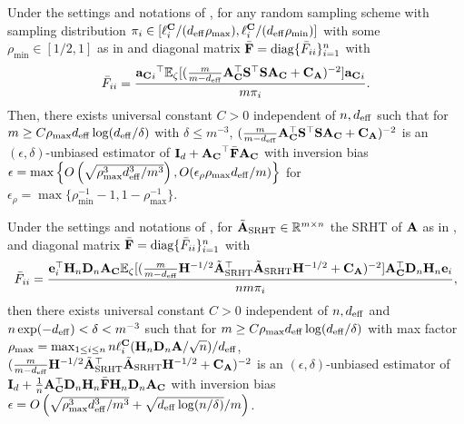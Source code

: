 \documentclass[11pt,a4paper]{article}
\begin{document}
\begin{corollary}\label{coro:sec.moment_lev}
Under the settings and notations of , for any random sampling scheme with sampling distribution $\pi_i\in [\ell^{\mathbf{C}}_{i}/(d_{\mathrm{eff}}\rho_{\max}), \ell^{\mathbf{C}}_{i}/(d_{\mathrm{eff}} \rho_{\min})]$ with some $\rho_{\min} \in [1/2,1]$ as in  and diagonal matrix $\bar {\mathbf{F}}=\operatorname{diag}\{\bar F_{ii}\}^n_{i=1}$ with
\begin{equation*}
    \bar F_{ii}= \frac{{{\mathbf{a}_{\mathbf{C}}}_i}^\top{\mathbb{E}}_{\zeta}[(\frac{m}{m-d_{\mathrm{eff}}}\mathbf{A}_{\mathbf{C}}^\top \mathbf{S}^\top \mathbf{S}\mathbf{A}_{\mathbf{C}}+ \mathbf{C}_{\mathbf{A}} )^{-2}]{\mathbf{a}_{\mathbf{C}}}_i}{m\pi_i}.
\end{equation*}  
Then, there exists universal constant $C > 0$ independent of $n,d_{\mathrm{eff}}$ such that for $m\geq C\rho_{\max} d_{\mathrm{eff}}\log(d_{\mathrm{eff}}/\delta )$ with $\delta\leq m^{-3}$, $(\frac{m}{m-d_{\mathrm{eff}}}\mathbf{A}_{\mathbf{C}}^\top \mathbf{S}^\top \mathbf{S}\mathbf{A}_{\mathbf{C}} + \mathbf{C}_{\mathbf{A}} )^{-2}$ is  an $(\epsilon,\delta)$-unbiased estimator of $\mathbf{I}_{d}+{\mathbf{A}_{\mathbf{C}}}^\top\bar {\mathbf{F}}{\mathbf{A}_{\mathbf{C}}}$ with inversion bias $\epsilon=\max\left\{O\left(\sqrt{\rho_{\max}^3d^3_{\mathrm{eff}}/m^3}\right),O(\epsilon_{\rho}\rho_{\max}d_{\mathrm{eff}}/m)\right\}$ for $\epsilon_{\rho}=\max\{\rho_{\min}^{-1}-1,1 - \rho_{\max}^{-1}\}$. 
\end{corollary}

\begin{corollary}\label{coro:sec.moment_SRHT}
Under the  settings and notations of , 
for $\tilde{\mathbf{A}}_{\rm SRHT} \in {\mathbb{R}}^{m \times n}$ the SRHT of $\mathbf{A}$ as in , and diagonal matrix $\bar {\mathbf{F}}=\operatorname{diag}\{\bar F_{ii}\}^n_{i=1}$ with
\begin{equation*}
    \bar F_{ii}= \frac{\mathbf{e}_i^\top\mathbf{H}_n\mathbf{D}_n\mathbf{A}_{\mathbf{C}}{\mathbb{E}}_{\zeta}[(\frac{m}{m-d_{\mathrm{eff}}}\mathbf{H}^{-1/2}\tilde{\mathbf{A}}_{\rm SRHT} ^\top\tilde{\mathbf{A}}_{\rm SRHT}\mathbf{H}^{-1/2} + \mathbf{C}_{\mathbf{A}} )^{-2}]\mathbf{A}^\top_{\mathbf{C}}\mathbf{D}_n\mathbf{H}_n\mathbf{e}_i}{nm\pi_i},
\end{equation*} 
then there exists universal constant $C > 0$ independent of $n,d_{\mathrm{eff}}$ and $n \exp(-d_{\mathrm{eff}}) < \delta < m^{-3} $ such that for $m\geq C\rho_{\max} d_{\mathrm{eff}}\log(d_{\mathrm{eff}}/\delta )$ with max  factor $\rho_{\max} = \max_{1\leq i \leq n}n\ell^{\mathbf{C}}_i(\mathbf{H}_n \mathbf{D}_n \mathbf{A}/\sqrt{n})/d_{\mathrm{eff}}$, $(\frac{m}{m-d_{\mathrm{eff}}}\mathbf{H}^{-1/2}\tilde{\mathbf{A}}_{\rm SRHT} ^\top \tilde{\mathbf{A}}_{\rm SRHT}\mathbf{H}^{-1/2} + \mathbf{C}_{\mathbf{A}} )^{-2}$ is  an $(\epsilon,\delta)$-unbiased estimator of $\mathbf{I}_{d}+\frac{1}{n}\mathbf{A}^\top_{\mathbf{C}}\mathbf{D}_n\mathbf{H}_n\bar{\mathbf{F}}\mathbf{H}_n\mathbf{D}_n\mathbf{A}_{\mathbf{C}}$ with inversion bias $\epsilon=O\left(\sqrt{\rho_{\max}^3d^3_{\mathrm{eff}}/m^3}+\sqrt{d_{\mathrm{eff}}\log(n/\delta)}/m
\right)$. 
\end{corollary}
\end{document}
